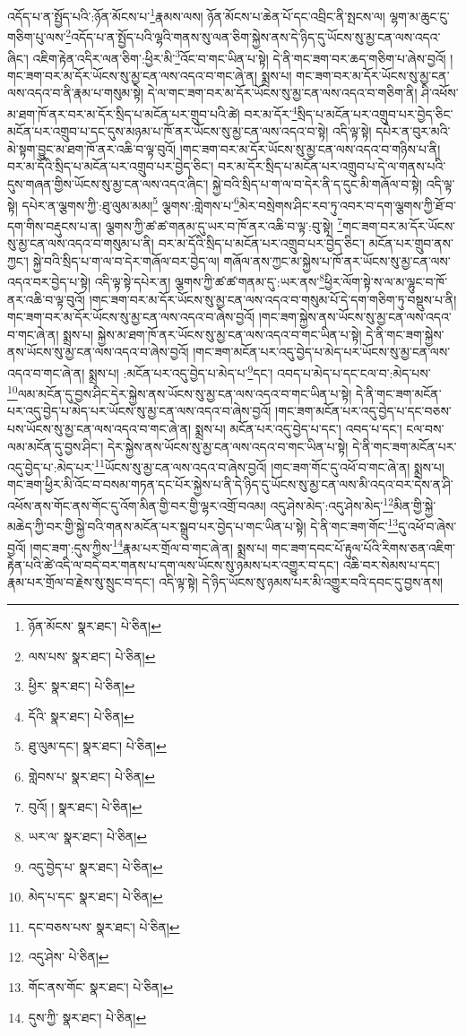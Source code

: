 འདོད་པ་ན་སྤྱོད་པའི་:ཉོན་མོངས་པ་\footnote{ཉོན་མོངས་  སྣར་ཐང་།  པེ་ཅིན། }རྣམས་ལས། ཉོན་མོངས་པ་ཆེན་པོ་དང་འབྲིང་ནི་སྤངས་ལ། ལྷག་མ་ཆུང་ངུ་གཅིག་པུ་ལས་\footnote{ལས་པས་  སྣར་ཐང་།  པེ་ཅིན། }འདོད་པ་ན་སྤྱོད་པའི་ལྷའི་གནས་སུ་ལན་ཅིག་སྐྱེས་ནས་དེ་ཉིད་དུ་ཡོངས་སུ་མྱ་ངན་ལས་འདའ་ཞིང་། འཇིག་རྟེན་འདིར་ལན་ཅིག་:ཕྱིར་མི་\footnote{ཕྱིར་  སྣར་ཐང་།  པེ་ཅིན། }འོང་བ་གང་ཡིན་པ་སྟེ། དེ་ནི་གང་ཟག་བར་ཆད་གཅིག་པ་ཞེས་བྱའོ། །གང་ཟག་བར་མ་དོར་ཡོངས་སུ་མྱ་ངན་ལས་འདའ་བ་གང་ཞེ་ན། སྨྲས་པ། གང་ཟག་བར་མ་དོར་ཡོངས་སུ་མྱ་ངན་ལས་འདའ་བ་ནི་རྣམ་པ་གསུམ་སྟེ། དེ་ལ་གང་ཟག་བར་མ་དོར་ཡོངས་སུ་མྱ་ངན་ལས་འདའ་བ་གཅིག་ནི། ཤི་འཕོས་མ་ཐག་ཁོ་ནར་བར་མ་དོར་སྲིད་པ་མངོན་པར་གྲུབ་པའི་ཚེ། བར་མ་དོར་\footnote{དོའི་  སྣར་ཐང་།  པེ་ཅིན། }སྲིད་པ་མངོན་པར་འགྲུབ་པར་བྱེད་ཅིང་མངོན་པར་འགྲུབ་པ་དང་དུས་མཉམ་པ་ཁོ་ནར་ཡོངས་སུ་མྱ་ངན་ལས་འདའ་བ་སྟེ། འདི་ལྟ་སྟེ། དཔེར་ན་བུར་མའི་མེ་སྟག་བྱུང་མ་ཐག་ཁོ་ནར་འཆི་བ་ལྟ་བུའོ། །གང་ཟག་བར་མ་དོར་ཡོངས་སུ་མྱ་ངན་ལས་འདའ་བ་གཉིས་པ་ནི། བར་མ་དོའི་སྲིད་པ་མངོན་པར་འགྲུབ་པར་བྱེད་ཅིང་། བར་མ་དོར་སྲིད་པ་མངོན་པར་འགྲུབ་པ་དེ་ལ་གནས་པའི་དུས་གཞན་གྱིས་ཡོངས་སུ་མྱ་ངན་ལས་འདའ་ཞིང་། སྐྱེ་བའི་སྲིད་པ་ག་ལ་བ་དེར་ནི་ད་དུང་མི་གཞོལ་བ་སྟེ། འདི་ལྟ་སྟེ། དཔེར་ན་ལྕགས་ཀྱི་:ཐུ་ལུམ་མམ།\footnote{ཐུ་ལུམ་དང་།  སྣར་ཐང་།  པེ་ཅིན། } ལྕགས་:གླེགས་པ་\footnote{གླེབས་པ་  སྣར་ཐང་།  པེ་ཅིན། }མེར་བསྲེགས་ཤིང་རབ་ཏུ་འབར་བ་དག་ལྕགས་ཀྱི་ཐོ་བ་དག་གིས་བརྡུངས་པ་ན། ལྕགས་ཀྱི་ཚ་ཚ་གནམ་དུ་ཡར་བ་ཁོ་ནར་འཆི་བ་ལྟ་:བུ་སྟེ། \footnote{བུའོ། །   སྣར་ཐང་།  པེ་ཅིན། }གང་ཟག་བར་མ་དོར་ཡོངས་སུ་མྱ་ངན་ལས་འདའ་བ་གསུམ་པ་ནི། བར་མ་དོའི་སྲིད་པ་མངོན་པར་འགྲུབ་པར་བྱེད་ཅིང་། མངོན་པར་གྲུབ་ནས་ཀྱང་། སྐྱེ་བའི་སྲིད་པ་ག་ལ་བ་དེར་གཞོལ་བར་བྱེད་ལ། གཞོལ་ནས་ཀྱང་མ་སྐྱེས་པ་ཁོ་ནར་ཡོངས་སུ་མྱ་ངན་ལས་འདའ་བར་བྱེད་པ་སྟེ། འདི་ལྟ་སྟེ་དཔེར་ན། ལྕགས་ཀྱི་ཚ་ཚ་གནམ་དུ་:ཡར་ནས་\footnote{ཡར་ལ་  སྣར་ཐང་།  པེ་ཅིན། }ཕྱིར་ལོག་སྟེ་ས་ལ་མ་ལྷུང་བ་ཁོ་ནར་འཆི་བ་ལྟ་བུའོ། །གང་ཟག་བར་མ་དོར་ཡོངས་སུ་མྱ་ངན་ལས་འདའ་བ་གསུམ་པོ་དེ་དག་གཅིག་ཏུ་བསྡུས་པ་ནི། གང་ཟག་བར་མ་དོར་ཡོངས་སུ་མྱ་ངན་ལས་འདའ་བ་ཞེས་བྱའོ། །གང་ཟག་སྐྱེས་ནས་ཡོངས་སུ་མྱ་ངན་ལས་འདའ་བ་གང་ཞེ་ན། སྨྲས་པ། སྐྱེས་མ་ཐག་ཁོ་ནར་ཡོངས་སུ་མྱ་ངན་ལས་འདའ་བ་གང་ཡིན་པ་སྟེ། དེ་ནི་གང་ཟག་སྐྱེས་ནས་ཡོངས་སུ་མྱ་ངན་ལས་འདའ་བ་ཞེས་བྱའོ། །གང་ཟག་མངོན་པར་འདུ་བྱེད་པ་མེད་པར་ཡོངས་སུ་མྱ་ངན་ལས་འདའ་བ་གང་ཞེ་ན། སྨྲས་པ། :མངོན་པར་འདུ་བྱེད་པ་མེད་པ་\footnote{འདུ་བྱེད་པ་  སྣར་ཐང་།  པེ་ཅིན། }དང་། འབད་པ་མེད་པ་དང་ངལ་བ་:མེད་པས་\footnote{མེད་པ་དང་  སྣར་ཐང་།  པེ་ཅིན། }ལམ་མངོན་དུ་བྱས་ཤིང་དེར་སྐྱེས་ནས་ཡོངས་སུ་མྱ་ངན་ལས་འདའ་བ་གང་ཡིན་པ་སྟེ། དེ་ནི་གང་ཟག་མངོན་པར་འདུ་བྱེད་པ་མེད་པར་ཡོངས་སུ་མྱ་ངན་ལས་འདའ་བ་ཞེས་བྱའོ། །གང་ཟག་མངོན་པར་འདུ་བྱེད་པ་དང་བཅས་པས་ཡོངས་སུ་མྱ་ངན་ལས་འདའ་བ་གང་ཞེ་ན། སྨྲས་པ། མངོན་པར་འདུ་བྱེད་པ་དང་། འབད་པ་དང་། ངལ་བས་ལམ་མངོན་དུ་བྱས་ཤིང་། དེར་སྐྱེས་ནས་ཡོངས་སུ་མྱ་ངན་ལས་འདའ་བ་གང་ཡིན་པ་སྟེ། དེ་ནི་གང་ཟག་མངོན་པར་འདུ་བྱེད་པ་:མེད་པར་\footnote{དང་བཅས་པས་  སྣར་ཐང་།  པེ་ཅིན། }ཡོངས་སུ་མྱ་ངན་ལས་འདའ་བ་ཞེས་བྱའོ། །གང་ཟག་གོང་དུ་འཕོ་བ་གང་ཞེ་ན། སྨྲས་པ། གང་ཟག་ཕྱིར་མི་འོང་བ་བསམ་གཏན་དང་པོར་སྐྱེས་པ་ནི་དེ་ཉིད་དུ་ཡོངས་སུ་མྱ་ངན་ལས་མི་འདའ་བར་དེས་ན་ཤི་འཕོས་ནས་གོང་ནས་གོང་དུ་འོག་མིན་གྱི་བར་གྱི་ལྷར་འགྲོ་བའམ། འདུ་ཤེས་མེད་:འདུ་ཤེས་མེད་\footnote{འདུ་ཤེས་  པེ་ཅིན། }མིན་གྱི་སྐྱེ་མཆེད་ཀྱི་བར་གྱི་སྐྱེ་བའི་གནས་མངོན་པར་སྒྲུབ་པར་བྱེད་པ་གང་ཡིན་པ་སྟེ། དེ་ནི་གང་ཟག་གོང་\footnote{གོང་ནས་གོང་  སྣར་ཐང་།  པེ་ཅིན། }དུ་འཕོ་བ་ཞེས་བྱའོ། །གང་ཟག་:དུས་ཀྱིས་\footnote{དུས་ཀྱི་  སྣར་ཐང་།  པེ་ཅིན། }རྣམ་པར་གྲོལ་བ་གང་ཞེ་ན། སྨྲས་པ། གང་ཟག་དབང་པོ་རྟུལ་པོའི་རིགས་ཅན་འཇིག་རྟེན་པའི་ཚེ་འདི་ལ་བདེ་བར་གནས་པ་དག་ལས་ཡོངས་སུ་ཉམས་པར་འགྱུར་བ་དང་། འཆི་བར་སེམས་པ་དང་། རྣམ་པར་གྲོལ་བ་རྗེས་སུ་སྲུང་བ་དང་། འདི་ལྟ་སྟེ། དེ་ཉིད་ཡོངས་སུ་ཉམས་པར་མི་འགྱུར་བའི་དབང་དུ་བྱས་ནས། 